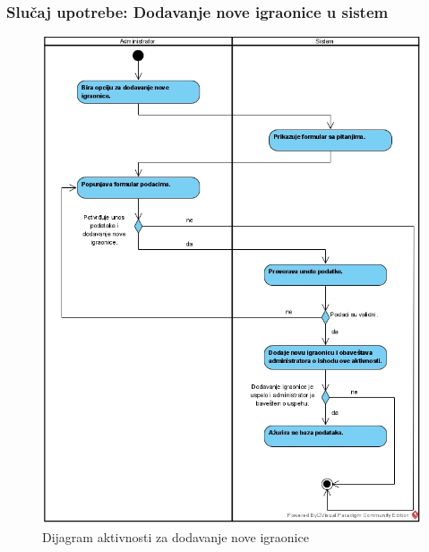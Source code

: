 \documentclass[a4paper]{article}
\begin{document}
\subsubsection{Slučaj upotrebe: Dodavanje nove igraonice u sistem}

\begin{figure}[!ht]
\begin{center}
\includegraphics[scale=0.55]{sections/images/dijagram_aktivnosti_dodavanja_nove_igraonice.jpg}
\end{center}
\caption{Dijagram aktivnosti za dodavanje nove igraonice}
\label{fig:kontekst}
\end{figure}
\end{document}
